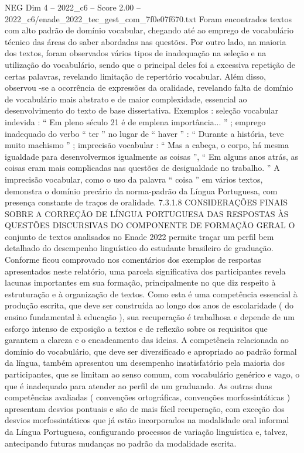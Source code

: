 \begin{textsample}{NEG Dim 4 – 2022\_c6 – Score 2.00 – 2022\_c6/enade\_2022\_tec\_gest\_com\_7f0e07f670.txt}
Foram encontrados textos com alto padrão de domínio vocabular, chegando até ao emprego de vocabulário técnico das áreas do saber abordadas nas questões.
Por outro lado, na maioria dos textos, foram observados vários tipos de inadequação na seleção e na utilização do vocabulário, sendo que o principal deles foi a excessiva repetição de certas palavras, revelando limitação de repertório vocabular.
Além disso, observou -se a ocorrência de expressões da oralidade, revelando falta de domínio de vocabulário mais abstrato e de maior complexidade, essencial ao desenvolvimento do texto de base dissertativa.
Exemplos : seleção vocabular indevida : “ Em pleno século 21 é de emplena importância... ” ; emprego inadequado do verbo “ ter ” no lugar de “ haver ” : “ Durante a história, teve muito machismo ” ; imprecisão vocabular : “ Mas a cabeça, o corpo, há mesma igualdade para desenvolvermos igualmente as coisas ”, “ Em alguns anos atrás, as coisas eram mais complicadas nas questões de desigualdade no trabalho. ” A imprecisão vocabular, como o uso da palavra “ coisa ” em vários textos, demonstra o domínio precário da norma-padrão da Língua Portuguesa, com presença constante de traços de oralidade. 7.3.1.8 CONSIDERAÇÕES FINAIS SOBRE A CORREÇÃO DE LÍNGUA PORTUGUESA DAS RESPOSTAS ÀS QUESTÕES DISCURSIVAS DO COMPONENTE DE FORMAÇÃO GERAL O conjunto de textos analisados no Enade 2022 permite traçar um perfil bem detalhado do desempenho linguístico do estudante brasileiro de graduação.
Conforme ficou comprovado nos comentários dos exemplos de respostas apresentados neste relatório, uma parcela significativa dos participantes revela lacunas importantes em sua formação, principalmente no que diz respeito à estruturação e à organização de textos.
Como esta é uma competência essencial à produção escrita, que deve ser construída ao longo dos anos de escolaridade ( do ensino fundamental à educação ), sua recuperação é trabalhosa e depende de um esforço intenso de exposição a textos e de reflexão sobre os requisitos que garantem a clareza e o encadeamento das ideias.
A competência relacionada ao domínio do vocabulário, que deve ser diversificado e apropriado ao padrão formal da língua, também apresentou um desempenho insatisfatório pela maioria dos participantes, que se limitam ao senso comum, com vocabulário genérico e vago, o que é inadequado para atender ao perfil de um graduando.
As outras duas competências avaliadas ( convenções ortográficas, convenções morfossintáticas ) apresentam desvios pontuais e são de mais fácil recuperação, com exceção dos desvios morfossintáticos que já estão incorporados na modalidade oral informal da Língua Portuguesa, configurando processos de variação linguística e, talvez, antecipando futuras mudanças no padrão da modalidade escrita.

\end{textsample}

